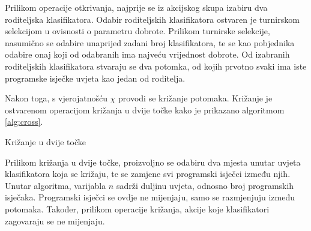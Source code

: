 \documentclass[times, utf8, zavrsni]{fer}
\begin{document}
Prilikom operacije otkrivanja, najprije se iz akcijskog skupa izabiru dva roditeljska klasifikatora.
Odabir roditeljskih klasifikatora ostvaren je turnirskom selekcijom  u ovisnosti o parametru dobrote.
Prilikom turnirske selekcije, nasumično se odabire unaprijed zadani broj klasifikatora, te se kao pobjednika odabire onaj koji od odabranih ima najveću vrijednost dobrote.
Od izabranih roditeljskih klasifikatora stvaraju se dva potomka, od kojih prvotno svaki ima iste programske isječke uvjeta kao jedan od roditelja.

Nakon toga, s vjerojatnošću $\chi$ provodi se križanje  potomaka.
Križanje je ostvarenom operacijom križanja u dvije točke  kako je prikazano algoritmom \ref{alg:cross}.
\begin{algorithm}[h]
    \caption{Križanje u dvije točke}
    \label{alg:cross}
    \begin{algorithmic}
        \STATE{$x :=$ proizvoljan decimalni broj iz intervala [0, n)}
        \STATE{$y :=$ proizvoljan decimalni broj iz intervala [0, n)}
        \ENDIF
        \ENDFOR
    \end{algorithmic}
\end{algorithm}
Prilikom križanja u dvije točke, proizvoljno se odabiru dva mjesta unutar uvjeta klasifikatora koja se križaju, te se zamjene svi programski isječci između njih.
Unutar algoritma, varijabla $n$ sadrži duljinu uvjeta, odnosno broj programskih isječaka.
Programski isječci se ovdje ne mijenjaju, samo se razmjenjuju između potomaka.
Također, prilikom operacije križanja, akcije koje klasifikatori zagovaraju se ne mijenjaju.
\end{document}
